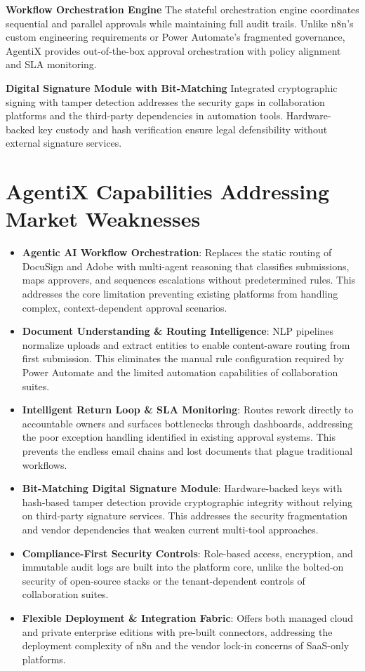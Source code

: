 \documentclass[12pt,oneside,openright,a4paper]{cpe-english-project}
\begin{document}
\textbf{Workflow Orchestration Engine}
The stateful orchestration engine coordinates sequential and parallel approvals while maintaining full audit trails. Unlike n8n's custom engineering requirements or Power Automate's fragmented governance, AgentiX provides out-of-the-box approval orchestration with policy alignment and SLA monitoring.

\textbf{Digital Signature Module with Bit-Matching}
Integrated cryptographic signing with tamper detection addresses the security gaps in collaboration platforms and the third-party dependencies in automation tools. Hardware-backed key custody and hash verification ensure legal defensibility without external signature services.

\vspace{2em}

\section{AgentiX Capabilities Addressing Market Weaknesses}

\begin{itemize}
\item
  \textbf{Agentic AI Workflow Orchestration}: Replaces the static routing of DocuSign and Adobe with multi-agent reasoning that classifies submissions, maps approvers, and sequences escalations without predetermined rules. This addresses the core limitation preventing existing platforms from handling complex, context-dependent approval scenarios.
\item
  \textbf{Document Understanding \& Routing Intelligence}: NLP pipelines normalize uploads and extract entities to enable content-aware routing from first submission. This eliminates the manual rule configuration required by Power Automate and the limited automation capabilities of collaboration suites.
\item
  \textbf{Intelligent Return Loop \& SLA Monitoring}: Routes rework directly to accountable owners and surfaces bottlenecks through dashboards, addressing the poor exception handling identified in existing approval systems. This prevents the endless email chains and lost documents that plague traditional workflows.
\item
  \textbf{Bit-Matching Digital Signature Module}: Hardware-backed keys with hash-based tamper detection provide cryptographic integrity without relying on third-party signature services. This addresses the security fragmentation and vendor dependencies that weaken current multi-tool approaches.
\item
  \textbf{Compliance-First Security Controls}: Role-based access, encryption, and immutable audit logs are built into the platform core, unlike the bolted-on security of open-source stacks or the tenant-dependent controls of collaboration suites.
\item
  \textbf{Flexible Deployment \& Integration Fabric}: Offers both managed cloud and private enterprise editions with pre-built connectors, addressing the deployment complexity of n8n and the vendor lock-in concerns of SaaS-only platforms.
\end{itemize}
\end{document}
